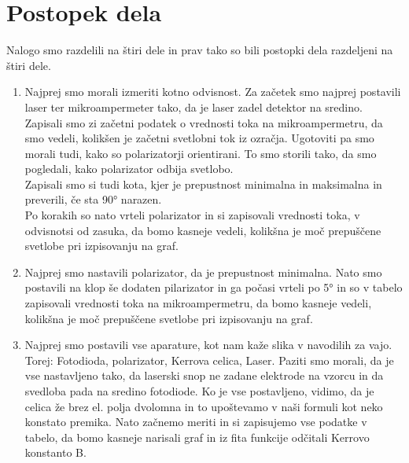 \documentclass[11pt, a4paper]{article}
\theoremstyle{definition}
\theoremstyle{example}
\theoremstyle{izrek}
\begin{document}
\section{Postopek dela}
Nalogo smo razdelili na štiri dele in prav tako so bili postopki dela razdeljeni na štiri dele. 
\begin{enumerate}
\item Najprej smo morali izmeriti kotno odvisnost. Za začetek smo najprej postavili laser ter mikroampermeter tako, da  je laser zadel detektor na sredino. Zapisali smo zi začetni podatek o vrednosti toka na mikroampermetru, da smo vedeli, kolikšen je začetni svetlobni tok iz ozračja. Ugotoviti pa smo morali tudi, kako so polarizatorji orientirani. To smo storili tako, da smo pogledali, kako polarizator odbija svetlobo. \\
Zapisali smo si tudi kota, kjer je prepustnost minimalna in maksimalna in preverili, če sta 90° narazen. \\
Po korakih so nato vrteli polarizator in si zapisovali vrednosti toka, v odvisnotsi od zasuka, da bomo kasneje vedeli, kolikšna je moč prepuščene svetlobe pri izpisovanju na graf. 

\item Najprej smo nastavili polarizator, da je prepustnost minimalna. Nato smo postavili na klop še dodaten pilarizator in ga počasi vrteli po 5° in so v tabelo zapisovali vrednosti toka na mikroampermetru, da bomo kasneje vedeli, kolikšna je moč prepuščene svetlobe pri izpisovanju na graf. 

\item Najprej smo postavili vse aparature, kot nam kaže slika v navodilih za vajo. Torej: Fotodioda, polarizator, Kerrova celica, Laser. Paziti smo morali, da je vse nastavljeno tako, da laserski snop ne zadane elektrode na vzorcu in da svedloba pada na sredino fotodiode. Ko je vse postavljeno, vidimo, da je celica že brez el. polja dvolomna in to upoštevamo v naši formuli kot neko konstato premika. Nato začnemo meriti in si zapisujemo vse podatke v tabelo, da bomo kasneje narisali graf in iz fita funkcije odčitali Kerrovo konstanto B.


\end{enumerate}
\end{document}
